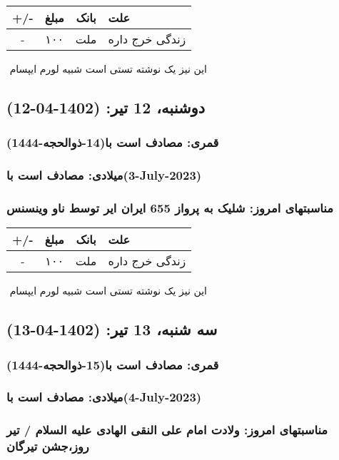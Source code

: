 \documentclass{article}
\newcommand{\rnote}[1]{\marginpar{\textcolor{color}{\StrSubstitute{\##1}{ }{\_}}}}
\newcommand{\myRow}[4]{
    #1 & #2 & #3 & #4 \\ \hline
}
\begin{document}
\begin{tabular}{ | c | c | c | p{5cm} |}
    \hline
    \myRow{ +/- }{مبلغ}{بانک}{علت}
    \myRow{-}{۱۰۰}{ملت}{زندگی خرج داره}
\end{tabular}
\newline
\newline

‌
\rnote{تست}
این نیز یک نوشته تستی است شبیه لورم ایپسام




\newpage
{}
\textcolor{color}{
\section{ دوشنبه، 12 تیر: (1402-04-12) }
\subsubsection*{قمری: مصادف است با(14-ذوالحجه-1444)} 
\subsubsection*{میلادی: مصادف است با(3-July-2023)}
\subsubsection*{مناسبتهای امروز: شلیک به پرواز 655 ایران ایر توسط ناو وینسنس}
}


\begin{tabular}{ | c | c | c | p{5cm} |}
    \hline
    \myRow{ +/- }{مبلغ}{بانک}{علت}
    \myRow{-}{۱۰۰}{ملت}{زندگی خرج داره}
\end{tabular}
\newline
\newline

‌
\rnote{تست}
این نیز یک نوشته تستی است شبیه لورم ایپسام




\newpage
{}
\textcolor{color}{
\section{ سه شنبه، 13 تیر: (1402-04-13) }
\subsubsection*{قمری: مصادف است با(15-ذوالحجه-1444)} 
\subsubsection*{میلادی: مصادف است با(4-July-2023)}
\subsubsection*{مناسبتهای امروز: ولادت امام علی النقی الهادی علیه السلام / تیر روز،جشن تیرگان}
}
\end{document}
